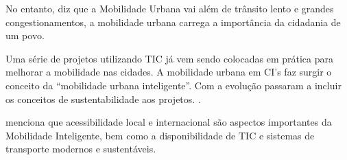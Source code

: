 No entanto,  diz que a Mobilidade Urbana vai além de trânsito lento e grandes congestionamentos, a mobilidade urbana carrega a importância da cidadania de um povo.

Uma série de projetos utilizando TIC já vem sendo colocadas em prática para melhorar a mobilidade nas cidades. A mobilidade urbana em CI's faz surgir o
conceito da “mobilidade urbana inteligente”. Com a evolução passaram a incluir os conceitos de sustentabilidade aos projetos. \cite{cocchia}. 

 menciona que acessibilidade local e internacional são aspectos importantes da Mobilidade Inteligente, bem como a disponibilidade de TIC e sistemas de transporte modernos e sustentáveis.














